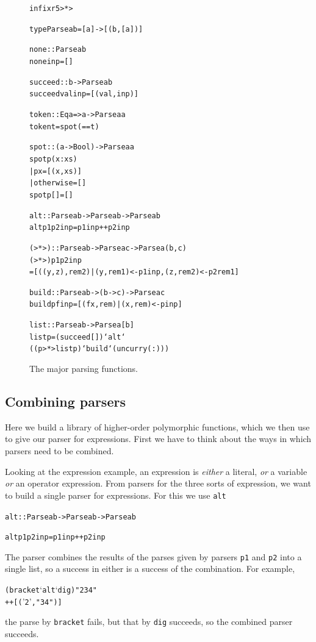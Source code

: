\begin{figure}
\begin{alltt}
infixr 5 >*>

type Parse a b = [a] -> [(b,[a])]
 
none :: Parse a b
none inp = []
 
succeed :: b -> Parse a b 
succeed val inp = [(val,inp)]
 
token :: Eq a => a -> Parse a a
token t = spot (==t)
 
spot :: (a -> Bool) -> Parse a a
spot p (x:xs) 
  | p x         = [(x,xs)]
  | otherwise   = []
spot p []       = []
 
alt :: Parse a b -> Parse a b -> Parse a b
alt p1 p2 inp = p1 inp ++ p2 inp

(>*>) :: Parse a b -> Parse a c -> Parse a (b,c)	
(>*>) p1 p2 inp 
  = [((y,z),rem2) | (y,rem1) <- p1 inp , (z,rem2) <- p2 rem1 ]
 
build :: Parse a b -> (b -> c) -> Parse a c
build p f inp = [ (f x,rem) | (x,rem) <- p inp ]
	
list :: Parse a b -> Parse a [b]
list p = (succeed []) `alt`
         ((p >*> list p) `build` (uncurry (:)))
\end{alltt}
\caption{The major parsing functions.}
\label{majParsing}
\end{figure}

\subsection*{Combining parsers}

Here we build a library of higher-order polymorphic functions, which we then
use to give our parser for expressions. First we have to think about the ways
in which  parsers need to be combined. 

Looking at the expression example, an
expression is {\em either\/} a literal, {\em or\/} a variable {\em or\/} an
operator expression. From parsers for the three sorts of expression, we want
to build a single parser for expressions. For this we use \texttt{alt}
\begin{alltt}
alt :: Parse a b -> Parse a b -> Parse a b

alt p1 p2 inp = p1 inp ++ p2 inp
\end{alltt}
The parser combines the results of the parses given by parsers \texttt{p1} and
\texttt{p2} into a single list, so a success in either is a success of the
combination. For example,
\begin{alltt}
(bracket `alt` dig) "234" 
\step [] ++ [('2',"34")]
\end{alltt}
the parse by \texttt{bracket} fails, but that by \texttt{dig} succeeds, so the
combined parser succeeds.

